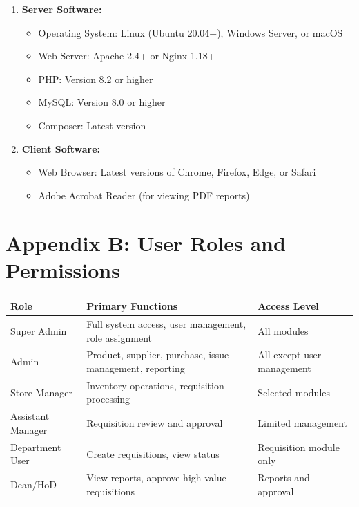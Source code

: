 \begin{enumerate}
    \item \textbf{Server Software:}
    \begin{itemize}
        \item Operating System: Linux (Ubuntu 20.04+), Windows Server, or macOS
        \item Web Server: Apache 2.4+ or Nginx 1.18+
        \item PHP: Version 8.2 or higher
        \item MySQL: Version 8.0 or higher
        \item Composer: Latest version
    \end{itemize}

    \item \textbf{Client Software:}
    \begin{itemize}
        \item Web Browser: Latest versions of Chrome, Firefox, Edge, or Safari
        \item Adobe Acrobat Reader (for viewing PDF reports)
    \end{itemize}
\end{enumerate}

\section{Appendix B: User Roles and Permissions}

\begin{longtable}{|p{2cm}|p{3.5cm}|p{3.5cm}|}
\hline
\textbf{Role} & \textbf{Primary Functions} & \textbf{Access Level}\\
\hline
\endhead
Super Admin & Full system access, user management, role assignment & All modules\\
\hline
Admin & Product, supplier, purchase, issue management, reporting & All except user management\\
\hline
Store Manager & Inventory operations, requisition processing & Selected modules\\
\hline
Assistant Manager & Requisition review and approval & Limited management\\
\hline
Department User & Create requisitions, view status & Requisition module only\\
\hline
Dean/HoD & View reports, approve high-value requisitions & Reports and approval\\
\hline
\end{longtable}

